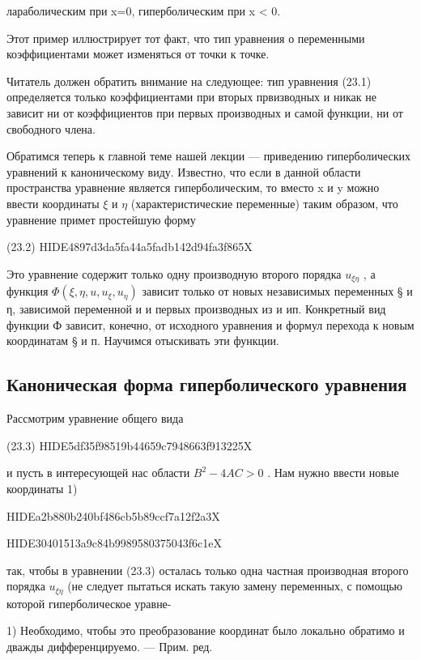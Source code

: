\documentclass[
  ukrainian,
]{article}
\begin{document}
лараболическим при x=0, гиперболическим при x \textless{} 0.

Этот пример иллюстрирует тот факт, что тип уравнения о переменными
коэффициентами может изменяться от точки к точке.

Читатель должен обратить внимание на следующее: тип уравнения (23.1)
определяется только коэффициентами при вторых првизводных и никак не
зависит ни от коэффициентов при первых производных и самой функции, ни
от свободного члена.

Обратимся теперь к главной теме нашей лекции --- приведению
гиперболических уравнений к каноническому виду. Известно, что если в
данной области пространства уравнение является гиперболическим, то
вместо x и y можно ввести координаты \(\xi\) и \(\eta\)
(характеристические переменные) таким образом, что уравнение примет
простейшую форму

(23.2) HIDE4897d3da5fa44a5fadb142d94fa3f865X

Это уравнение содержит только одну производную второго порядка
\(u_{\xi\eta}\) , а функция \(\Phi(\xi,\eta,u,u_{\xi},u_{\eta})\)
зависит только от новых независимых переменных § и η, зависимой
переменной и и первых производных из и ип. Конкретный вид функции Ф
зависит, конечно, от исходного уравнения и формул перехода к новым
координатам § и п. Научимся отыскивать эти функции.

\subsection{Каноническая форма гиперболического
уравнения}\label{ux43aux430ux43dux43eux43dux438ux447ux435ux441ux43aux430ux44f-ux444ux43eux440ux43cux430-ux433ux438ux43fux435ux440ux431ux43eux43bux438ux447ux435ux441ux43aux43eux433ux43e-ux443ux440ux430ux432ux43dux435ux43dux438ux44f}

Рассмотрим уравнение общего вида

(23.3) HIDE5df35f98519b44659c7948663f913225X

и пусть в интересующей нас области \(B^2 - 4AC > 0\) . Нам нужно ввести
новые координаты 1)

HIDEa2b880b240bf486cb5b89ccf7a12f2a3X

HIDE30401513a9c84b9989580375043f6c1eX

так, чтобы в уравнении (23.3) осталась только одна частная производная
второго порядка \(u_{\xi\eta}\) (не следует пытаться искать такую замену
переменных, с помощью которой гиперболическое уравне-

1) Необходимо, чтобы это преобразование координат было локально обратимо
и дважды дифференцируемо. --- Прим. ред.
\end{document}
